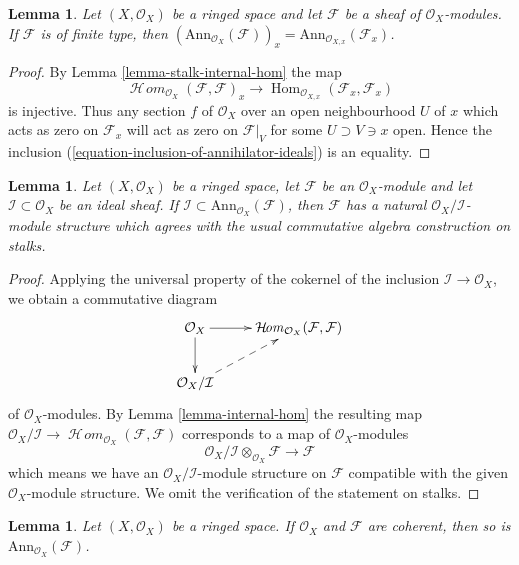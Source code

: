 \documentclass{stacks-project}
\theoremstyle{plain}
\newtheorem{lemma}[subsection]{Lemma}
\theoremstyle{definition}
\theoremstyle{remark}
\numberwithin{equation}{subsection}
\def\Hom{\mathop{\mathrm{Hom}}\nolimits}
\def\SheafHom{\mathop{\mathcal{H}\!\mathit{om}}\nolimits}
\begin{document}
\begin{lemma}
\label{lemma-finite-type-annihilator-stalk}
Let $(X, \mathcal{O}_X)$ be a ringed space and let
$\mathcal{F}$ be a sheaf of $\mathcal{O}_X$-modules.
If $\mathcal{F}$ is of finite type, then
$(\text{Ann}_{\mathcal{O}_X}(\mathcal{F}))_x =
\text{Ann}_{\mathcal{O}_{X, x}}(\mathcal{F}_x)$.
\end{lemma}

\begin{proof}
By Lemma \ref{lemma-stalk-internal-hom} the map
$$
\SheafHom_{\mathcal{O}_X}(\mathcal{F}, \mathcal{F})_x \longrightarrow
\Hom_{\mathcal{O}_{X,x}}(\mathcal{F}_x, \mathcal{F}_x)
$$
is injective. Thus any section $f$ of $\mathcal{O}_X$ over an open
neighbourhood $U$ of $x$ which acts as zero on $\mathcal{F}_x$
will act as zero on $\mathcal{F}|_V$ for some $U \supset V \ni x$ open.
Hence the inclusion (\ref{equation-inclusion-of-annihilator-ideals})
is an equality.
\end{proof}

\begin{lemma}
\label{lemma-induced-quotient-ring-sheaf-module-structure}
Let $(X, \mathcal{O}_X)$ be a ringed space, let $\mathcal{F}$ be an
$\mathcal{O}_X$-module and let $\mathcal{I} \subset \mathcal{O}_X$
be an ideal sheaf. If
$\mathcal{I} \subset \text{Ann}_{\mathcal{O}_X}(\mathcal{F})$,
then $\mathcal{F}$ has a natural $\mathcal{O}_X/\mathcal{I}$-module structure
which agrees with the usual commutative algebra construction on stalks.
\end{lemma}

\begin{proof}
Applying the universal property of the cokernel of the inclusion
$\mathcal{I} \to \mathcal{O}_X$, we obtain a commutative diagram
$$
\xymatrix{
\mathcal{O}_X \ar[r] \ar[d] &
\SheafHom_{\mathcal{O}_X}(\mathcal{F}, \mathcal{F}) \\
\mathcal{O}_X/\mathcal{I} \ar@{-->}[ur]
}
$$
of $\mathcal{O}_X$-modules. By Lemma \ref{lemma-internal-hom}
the resulting map $\mathcal{O}_X/\mathcal{I} \to
\SheafHom_{\mathcal{O}_X}(\mathcal{F}, \mathcal{F})$
corresponds to a map of $\mathcal{O}_X$-modules
$$
\mathcal{O}_X/\mathcal{I} \otimes_{\mathcal{O}_X} \mathcal{F}
\longrightarrow
\mathcal{F}
$$
which means we have an $\mathcal{O}_X/\mathcal{I}$-module structure
on $\mathcal{F}$ compatible with the given $\mathcal{O}_X$-module structure.
We omit the verification of the statement on stalks.
\end{proof}

\begin{lemma}
\label{lemma-coherent-annihilator}
Let $(X,\mathcal{O}_X)$ be a ringed space.
If $\mathcal{O}_X$ and $\mathcal{F}$ are coherent,
then so is $\text{Ann}_{\mathcal{O}_X}(\mathcal{F})$.
\end{lemma}
\end{document}
